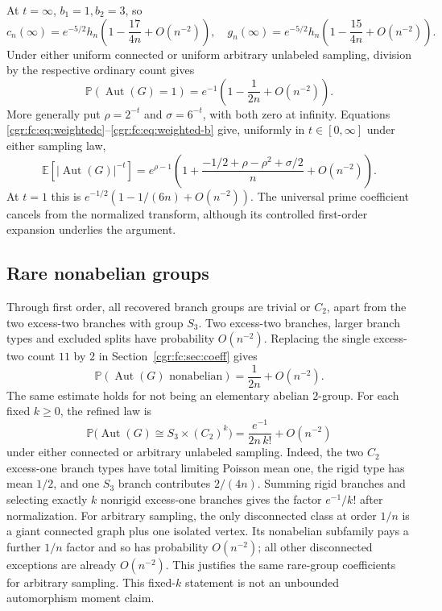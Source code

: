 \documentclass[11pt,letterpaper]{article}
\numberwithin{equation}{section}
\theoremstyle{definition}\newtheorem{definition}[theorem]{Definition}
\theoremstyle{remark}\newtheorem{remark}[theorem]{Remark}
\newcommand{\PP}{\mathbb P}
\newcommand{\EE}{\mathbb E}
\DeclareMathOperator{\Aut}{Aut}
\begin{document}
At $t=\infty$, $b_1=1,b_2=3$, so
\[
 c_n(\infty)=e^{-5/2}h_n\left(1-\frac{17}{4n}+O(n^{-2})\right),
 \quad
 g_n(\infty)=e^{-5/2}h_n\left(1-\frac{15}{4n}+O(n^{-2})\right).
\]
Under either uniform connected or uniform arbitrary unlabeled
sampling, division by the respective ordinary count gives
\begin{equation}\label{cgr:fc:eq:asymmetric}
 \PP(\Aut(G)=1)=e^{-1}\left(1-\frac1{2n}+O(n^{-2})\right).
\end{equation}
More generally put $\rho=2^{-t}$ and $\sigma=6^{-t}$, with both
zero at infinity. Equations \eqref{cgr:fc:eq:weightedc}--\eqref{cgr:fc:eq:weighted-b}
give, uniformly in $t\in[0,\infty]$ under either sampling law,
\begin{equation}\label{cgr:fc:eq:aut-transform}
 \EE[|\Aut(G)|^{-t}]
 =e^{\rho-1}\left(1+
       \frac{-1/2+\rho-\rho^2+\sigma/2}{n}+O(n^{-2})\right).
\end{equation}
At $t=1$ this is
$e^{-1/2}(1-1/(6n)+O(n^{-2}))$.
The universal prime coefficient cancels from the normalized
transform, although its controlled first-order expansion underlies
the argument.

\subsection{Rare nonabelian groups}
Through first order, all recovered branch groups are trivial or
$C_2$, apart from the two excess-two branches with group $S_3$.
Two excess-two branches, larger branch types and excluded splits
have probability $O(n^{-2})$. Replacing the single excess-two
count $11$ by $2$ in Section~\ref{cgr:fc:sec:coeff} gives
\begin{equation}\label{cgr:fc:eq:nonabelian}
 \PP(\Aut(G)\text{ nonabelian})=\frac1{2n}+O(n^{-2}).
\end{equation}
The same estimate holds for not being an elementary abelian
$2$-group. For each fixed $k\ge0$, the refined law is
\begin{equation}\label{cgr:fc:eq:s3-law}
 \PP\bigl(\Aut(G)\cong S_3\times(C_2)^k\bigr)
 =\frac{e^{-1}}{2n\,k!}+O(n^{-2})
\end{equation}
under either connected or arbitrary unlabeled sampling.
Indeed, the two $C_2$ excess-one branch types have total limiting
Poisson mean one, the rigid type has mean $1/2$, and one $S_3$
branch contributes $2/(4n)$. Summing rigid branches and selecting
exactly $k$ nonrigid excess-one branches gives the factor
$e^{-1}/k!$ after normalization. For arbitrary sampling, the only disconnected class at order
$1/n$ is a giant connected graph plus one isolated vertex. Its
nonabelian subfamily pays a further $1/n$ factor and so has
probability $O(n^{-2})$; all other disconnected exceptions are
already $O(n^{-2})$. This justifies the same rare-group coefficients
for arbitrary sampling. This fixed-$k$ statement is not an
unbounded automorphism moment claim.
\end{document}
